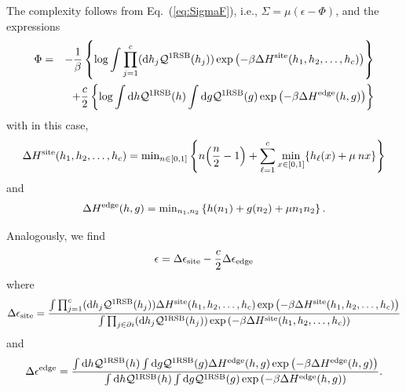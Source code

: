 \documentclass[11pt,a4paper]{article}
\newcommand{\iz}[1]{{\color{orange}[IN: #1]}}
\begin{document}
The complexity follows from Eq.~(\ref{eq:SigmaF}), i.e., $\Sigma = \mu(\epsilon-\Phi)$, and the expressions 
\begin{eqnarray}
\Phi &=& -\frac{1}{\beta} \left\{ \log  \int \prod^c_{j=1}({\rm d}h_j \mathcal{Q}^{\rm 1RSB}(h_j))  \exp\left(-\beta \Delta H^{\rm site}(h_{1},h_2,\ldots,h_c) \right) \right\} \nonumber\\ 
&&  + \frac{c}{2} \left\{ \log  \int  {\rm d}h \mathcal{Q}^{{\rm 1RSB}}(h)   \int  {\rm d}g \mathcal{Q}^{{\rm 1RSB}} (g)   \exp\left(-\beta \Delta H^{\rm edge}(h,g) \right) \right\}
\end{eqnarray}
with in this case, 
\begin{equation}
\Delta H^{\rm site}(h_{1},h_2,\ldots,h_c) = {\rm min}_{n\in [0,1]}\left\{ n\!\left(\frac{n}{2}-1\right)
      + \sum^{c}_{\ell=1 } \min_{x\in[0,1]}\{h_\ell(x)+ \mu \:  n x\}\right\}  
\end{equation}
and 
\begin{equation}
\Delta H^{\rm edge}(h,g) = {\rm min}_{n_1,n_2} \left\{h(n_1) +  g(n_2) +  \mu n_1n_2\right\}.
\end{equation}


Analogously, we find 
\begin{equation}
\epsilon =\Delta \epsilon_{\rm site} - \frac{c}{2}\Delta \epsilon_{\rm edge}
\end{equation}
where 
\begin{equation}
\Delta \epsilon_{\rm site} =   \frac{\int \prod^c_{j=1}({\rm d}h_j \mathcal{Q}^{{\rm 1RSB}}(h_j))   \Delta H^{\rm site}(h_{1},h_2,\ldots,h_{c})\exp\left(-\beta \Delta H^{\rm site}(h_{1},h_2,\ldots,h_{c}) \right)}{\int \prod_{j\in \partial i}({\rm d}h_j \mathcal{Q}^{{\rm 1RSB}}(h_j))  \exp\left(-\beta \Delta H^{\rm site}(h_{1},h_2,\ldots,h_{c}) \right)}
\end{equation}
and 
\begin{equation}
\Delta \epsilon^{\rm edge} =  \frac{ \int  {\rm d}h \mathcal{Q}^{{\rm 1RSB}}(h)   \int  {\rm d}g \mathcal{Q}^{{\rm 1RSB}} (g) \Delta H^{\rm edge}(h,g)  \exp\left(-\beta \Delta H^{\rm edge}(h,g) \right) }{ \int  {\rm d}h \mathcal{Q}^{{\rm 1RSB}}(h)   \int  {\rm d}g \mathcal{Q}^{{\rm 1RSB}} (g)   \exp\left(-\beta \Delta H^{\rm edge}(h,g) \right) } .
\end{equation} 


\end{document}
